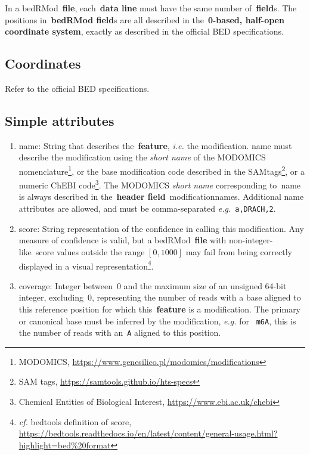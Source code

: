 \documentclass[11pt]{article}
\begin{document}
In a \ac{bedRMod}~\textbf{file}, each~\textbf{data line} must have the same number of~\textbf{field}s.
The positions in~\textbf{\acs{bedRMod} field}s are all described in the~\textbf{0-based, half-open coordinate system}, exactly as 
described in the official \ac{BED} specifications.

\subsection{Coordinates}
Refer to the official \ac{BED} specifications.

\subsection{Simple attributes}
\begin{enumerate}
\item \textsf{name}: String that describes the~\textbf{feature}, \textit{i.e.} the modification. \textsf{name} must describe 
the modification using the \emph{short name} of the MODOMICS nomenclature\footnote{MODOMICS, \url{https://www.genesilico.pl/modomics/modifications}}, or the base modification code described in the SAMtags\footnote{SAM tags, \url{https://samtools.github.io/hts-specs}}, or a numeric ChEBI code\footnote{Chemical Entities of Biological Interest, \url{https://www.ebi.ac.uk/chebi}}. The MODOMICS \emph{short name} corresponding to~\textsf{name} is always described in the~\textbf{header field}~\textsf{modification\textunderscore names}. Additional name attributes are allowed, and must be comma-separated \textit{e.g.}~\texttt{a,DRACH,2}.

\item \textsf{score}: String representation of the confidence in calling this modification. Any measure of confidence is valid, but a \ac{bedRMod}~\textbf{file} with non-integer-like~\textsf{score} values outside the range $[0, 1000]$ may fail from being correctly displayed in a visual representation\footnote{\textit{cf.} bedtools definition of score, \url{https://bedtools.readthedocs.io/en/latest/content/general-usage.html?highlight=bed\%20format}}.

\item \textsf{coverage}: Integer between~0 and the maximum size of an unsigned 64-bit integer, excluding~0, representing the number of reads with a base aligned to this reference position for which this~\textbf{feature} is a modification. The primary or canonical base must be inferred by the modification, \textit{e.g.} for ~\texttt{m6A}, this is the number of reads with an~\texttt{A} aligned to this position.


\end{enumerate}
\end{document}
